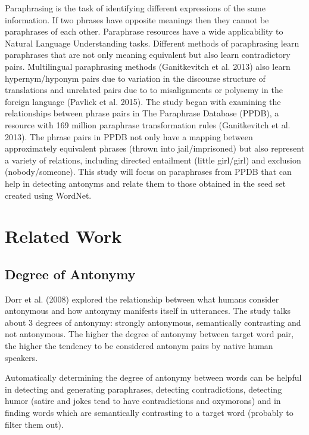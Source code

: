 \documentclass[11pt]{article}
\begin{document}
 Paraphrasing is the task of identifying different expressions of the same information. If two phrases have opposite meanings then they cannot be paraphrases of each other. Paraphrase resources have a wide applicability to Natural Language Understanding tasks. Different methods of paraphrasing learn paraphrases that are not only meaning equivalent but also learn contradictory pairs. Multilingual paraphrasing methods (Ganitkevitch et al. 2013) also learn hypernym/hyponym pairs due to variation
in the discourse structure of translations and unrelated pairs due to to misalignments
or polysemy in the foreign language (Pavlick et al. 2015). The study began with examining the relationships between phrase pairs in The Paraphrase Database (PPDB), a resource with 169 million paraphrase transformation rules (Ganitkevitch et al. 2013). The phrase pairs in PPDB not only have a mapping between approximately equivalent phrases (thrown into jail/imprisoned) but also represent a variety of relations, including directed entailment (little girl/girl) and exclusion (nobody/someone). This study will focus on paraphrases from PPDB that can help in detecting antonyms and relate them to those obtained in the seed set created using WordNet.

\section{Related Work}

\subsection{Degree of Antonymy}
Dorr et al. (2008) explored the relationship between what humans consider antonymous and how antonymy manifests itself in utterances. The study talks about 3 degrees of antonymy: strongly antonymous, semantically contrasting and not antonymous. The higher the degree of antonymy between target word pair, the higher the tendency to be considered antonym pairs by native human speakers.

Automatically determining the degree of antonymy between words can be helpful in detecting and generating paraphrases, detecting contradictions, detecting humor (satire and jokes tend to have contradictions and oxymorons) and in finding words which are semantically contrasting to a target word (probably to filter them out). 
\end{document}
